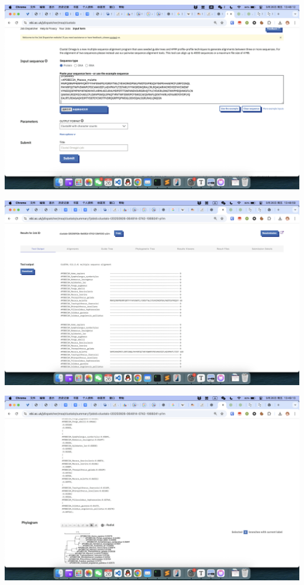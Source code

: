 \documentclass{article}
\begin{document}
\begin{center}
    \includegraphics[width=1\textwidth]{../images/task2/image1.png}
\end{center}
\begin{center}
    \includegraphics[width=1\textwidth]{../images/task2/image2.png}
\end{center}
\begin{center}
    \includegraphics[width=1\textwidth]{../images/task2/image3.png}
\end{center}
\end{document}
